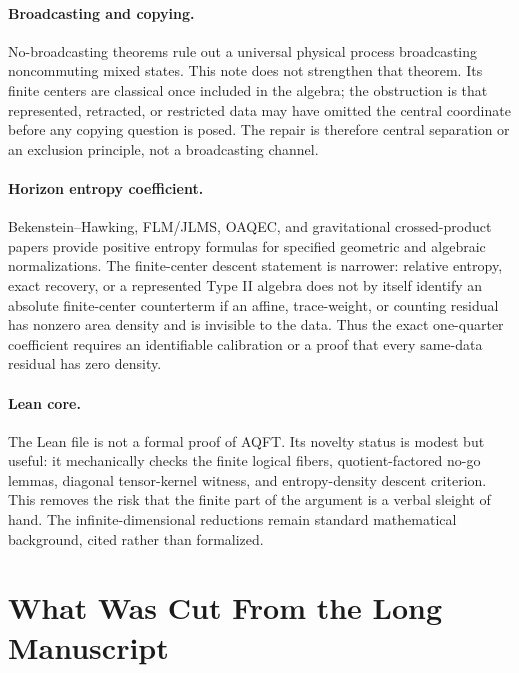 \documentclass[12pt]{article}
\theoremstyle{definition}
\theoremstyle{remark}
\begin{document}
\paragraph{Broadcasting and copying.}
No-broadcasting theorems rule out a universal physical process broadcasting
noncommuting mixed states.  This note does not strengthen that theorem.  Its
finite centers are classical once included in the algebra; the obstruction is
that represented, retracted, or restricted data may have omitted the central
coordinate before any copying question is posed.  The repair is therefore
central separation or an exclusion principle, not a broadcasting channel.

\paragraph{Horizon entropy coefficient.}
Bekenstein--Hawking, FLM/JLMS, OAQEC, and gravitational crossed-product papers
provide positive entropy formulas for specified geometric and algebraic
normalizations.  The finite-center descent statement is narrower: relative
entropy, exact recovery, or a represented Type II algebra does not by itself
identify an absolute finite-center counterterm if an affine, trace-weight, or
counting residual has nonzero area density and is invisible to the data.  Thus
the exact one-quarter coefficient requires an identifiable calibration or a
proof that every same-data residual has zero density.

\paragraph{Lean core.}
The Lean file is not a formal proof of AQFT.  Its novelty status is modest but
useful: it mechanically checks the finite logical fibers, quotient-factored
no-go lemmas, diagonal tensor-kernel witness, and entropy-density descent
criterion.  This removes the risk that the finite part of the argument is a
verbal sleight of hand.  The infinite-dimensional reductions remain standard
mathematical background, cited rather than formalized.

\section{What Was Cut From the Long Manuscript}
\end{document}
